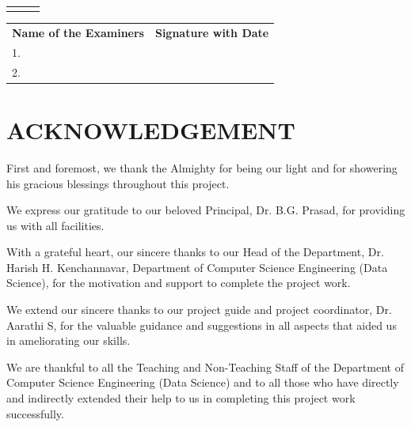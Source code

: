\documentclass[12pt,a4paper]{report}
\newcommand{\GuideName}{Dr. Aarathi S}
\newcommand{\ProjectCoordinator}{Dr. Aarathi S}
\begin{document}
\begin{center}
\begin{tabularx}{\textwidth}{
>{\centering\arraybackslash}X
>{\centering\arraybackslash}X
>{\centering\arraybackslash}X
}
[\ProjectCoordinator] &
[\GuideName] &
[Dr. Harish H. Kenchannavar]

\end{tabularx}

\vspace{1cm}

\begin{tabularx}{\textwidth}{p{8cm} X}

\hspace{1cm}\textbf{Name of the Examiners} &
\textbf{Signature with Date}
\\[0.4cm]

1. & \\[0.9cm]

2. &

\end{tabularx}

\end{center}


\clearpage
{}
\setcounter{page}{1}
\pagestyle{mainstyle}

\chapter*{ACKNOWLEDGEMENT}


\setlength{\parindent}{1.5em}
\setlength{\parskip}{0.8em}

First and foremost, we thank the Almighty for being our light and for showering his gracious blessings throughout this project.

We express our gratitude to our beloved Principal, Dr. B.G. Prasad, for providing us with all facilities.

With a grateful heart, our sincere thanks to our Head of the Department, Dr. Harish H. Kenchannavar, Department of Computer Science Engineering (Data Science), for the motivation and support to complete the project work.

We extend our sincere thanks to our project guide and project coordinator,  \ProjectCoordinator, for the valuable guidance and suggestions in all aspects that aided us in ameliorating our skills.

We are thankful to all the Teaching and Non-Teaching Staff of the Department of Computer Science Engineering (Data Science) and to all those who have directly and indirectly extended their help to us in completing this project work successfully.
\end{document}
